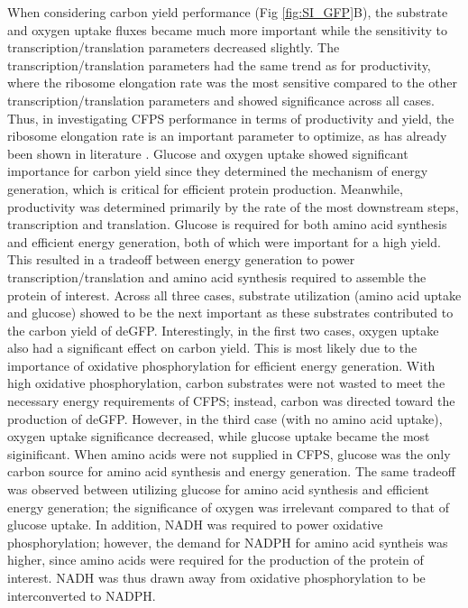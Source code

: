 \documentclass[journal=asbcd6,manuscript=article]{achemso}
\begin{document}
When considering carbon yield performance (Fig \ref{fig:SI_GFP}B), the substrate and oxygen uptake fluxes became much more important while the sensitivity to transcription/translation parameters decreased slightly.
The transcription/translation parameters had the same trend as for productivity, where the ribosome elongation rate was the most sensitive compared to the other transcription/translation parameters and showed significance across all cases.
Thus, in investigating CFPS performance in terms of productivity and yield, the ribosome elongation rate is an important parameter to optimize, as has already been shown in literature \cite{2005_underwood_biotech, 2014_li_PlosOne}.
Glucose and oxygen uptake showed significant importance for carbon yield since they determined the mechanism of energy generation, which is critical for efficient protein production.
Meanwhile, productivity was determined primarily by the rate of the most downstream steps, transcription and translation.
Glucose is required for both amino acid synthesis and efficient energy generation, both of which were important for a high yield.
This resulted in a tradeoff between energy generation to power transcription/translation and amino acid synthesis required to assemble the protein of interest.
Across all three cases, substrate utilization (amino acid uptake and glucose) showed to be the next important as these substrates contributed to the carbon yield of deGFP.
Interestingly, in the first two cases, oxygen uptake also had a significant effect on carbon yield.
This is most likely due to the importance of oxidative phosphorylation for efficient energy generation.
With high oxidative phosphorylation, carbon substrates were not wasted to meet the necessary energy requirements of CFPS; instead, carbon was directed toward the production of deGFP.
However, in the third case (with no amino acid uptake), oxygen uptake significance decreased, while glucose uptake became the most siginificant.
When amino acids were not supplied in CFPS, glucose was the only carbon source for amino acid synthesis and energy generation. 
The same tradeoff was observed between utilizing glucose for amino acid synthesis and efficient energy generation; the significance of oxygen was irrelevant compared to that of glucose uptake. 
In addition, NADH was required to power oxidative phosphorylation; however, the demand for NADPH for amino acid syntheis was higher, since amino acids were required for the production of the protein of interest. 
NADH was thus drawn away from oxidative phosphorylation to be interconverted to NADPH.
\end{document}
